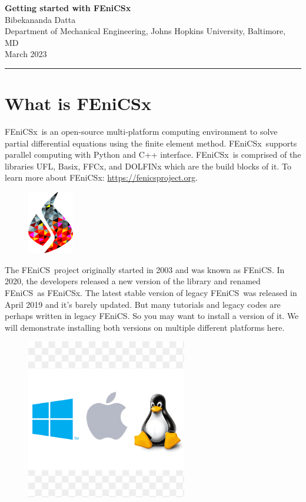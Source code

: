 \documentclass[12pt]{article}
\newcommand{\fenics}{\textsf{FEniCS}}
\newcommand{\fenicsx}{\textsf{FEniCSx}}
\begin{document}
\begin{center}
    {\textbf{\Large Getting started with \fenicsx}}\\ \vspace{0.25 cm}
    Bibekananda Datta \\
    Department of Mechanical Engineering, Johns Hopkins University, Baltimore, MD \\ \vspace{0.25 cm}
    March 2023
\end{center}
\vspace{5 mm}
\hrule

\section*{What is \fenicsx}

\fenicsx\ is an open-source multi-platform computing environment to solve partial differential equations using the finite element method. \fenicsx \ supports parallel computing with Python and C++ interface. \fenicsx \ is comprised of the libraries UFL, Basix, FFCx, and DOLFINx which are the build blocks of it. To learn more about \fenicsx: \url{https://fenicsproject.org}.

\begin{figure} [H]
    \centering
    \includegraphics[width=2cm]{fenics-logo.png}
\end{figure}

The \fenics \ project originally started in 2003 and was known as \fenics. In 2020, the developers released a new version of the library and renamed \fenics \ as \fenicsx. The latest stable version of legacy \fenics \ was released in April 2019 and it's barely updated. But many tutorials and legacy codes are perhaps written in legacy \fenics. So you may want to install a version of it. We will demonstrate installing both versions on multiple different platforms here.

\begin{figure} [H]
    \centering
    \includegraphics[width=7cm,trim={0 3.5cm 0 3.5cm},clip]{all-os-logo.png}
\end{figure}
\end{document}

